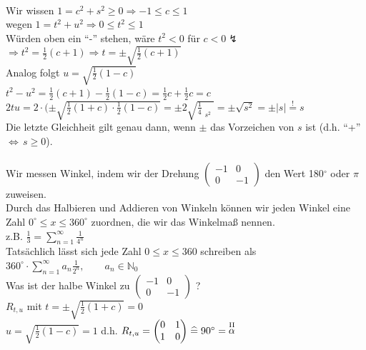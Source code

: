 \qquad\\
Wir wissen $1=c^{2}+s^{2}\geq 0 \Rightarrow  -1 \leq c \leq 1$\\
wegen $1=t^{2}+u^{2}\Rightarrow 0 \leq t^{2}\leq 1$\\
Würden oben ein "`-"' stehen, wäre $t^{2} < 0$ für $c<0 \lightning$\\
$\Rightarrow t^{2} = \frac{1}{2}(c+1) \Rightarrow t = \pm \sqrt{\frac{1}{2}(c+1)}$\\
Analog folgt $u=\sqrt{\frac{1}{2}(1-c)}$ \\
$t^{2}-u^{2} = \frac{1}{2}(c+1)-\frac{1}{2}(1-c)=\frac{1}{2}c + \frac{1}{2}c = c$\\
$2tu=2\cdot(\pm\sqrt{\frac{1}{2}(1+c)\cdot\frac{1}{2}(1-c)} = \pm 2 \sqrt{\frac{1}{4}\mathop{\underbrace{(1-c^{2})}}\limits_{s^{2}}} = \pm \sqrt{s^{2}} = \pm \vert s \vert \mathop{=}\limits^{\text{!}} s$\\
Die letzte Gleichheit gilt genau dann, wenn $\pm$ das Vorzeichen von $s$ ist (d.h. "`+"' $\Leftrightarrow \, s \geq 0$).\\
\qquad\\
Wir messen Winkel, indem wir der Drehung $\begin{pmatrix} -1 & 0 \\ 0 & -1 \end{pmatrix}$ den Wert 180$^{\circ}$ oder $\pi$ zuweisen.\\
Durch das Halbieren und Addieren von Winkeln können wir jeden Winkel eine Zahl $0^{\circ} \leq x \leq 360^{\circ}$ zuordnen, die wir das Winkelmaß nennen. \\
z.B. $\frac{1}{3} = \sum\limits^{\infty}_{n=1} \frac{1}{4^{n}}$\\
Tatsächlich lässt sich jede Zahl $ 0 \leq x \leq 360 $ schreiben als $360^{\circ} \cdot  \sum\limits^{\infty}_{n=1}a_{n}\frac{1}{2^{n}}, \qquad a_{n}\in  \mathbb{N}_{0}$ \\
Was ist der halbe Winkel zu $\begin{pmatrix} -1 & 0 \\ 0 & -1 \end{pmatrix}$ ?\\
$R_{t,u}$ mit $t = \pm \sqrt{\frac{1}{2}(1+c)} = 0$\\
$ u = \sqrt{\frac{1}{2}(1-c)} = 1$ d.h. $R_{t,u} = \begin{pmatrix} 0 & 1 \\ 1 & 0 \end{pmatrix} \mathrel{\widehat{=}} 90^{\circ} = \mathop{\alpha}\limits^{\text{\RM{2}}}$
%
%
%
